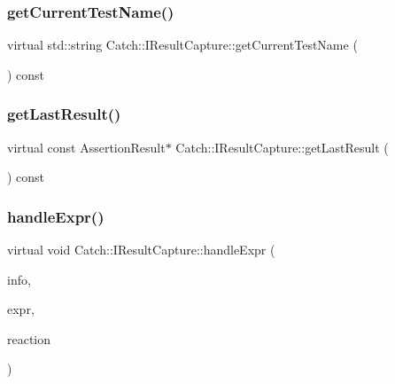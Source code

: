 \subsubsection{getCurrentTestName()}
{\footnotesize\ttfamily virtual std\+::string Catch\+::\+I\+Result\+Capture\+::get\+Current\+Test\+Name (\begin{DoxyParamCaption}{ }\end{DoxyParamCaption}) const\hspace{0.3cm}{\ttfamily [pure virtual]}}

\mbox{\label{struct_catch_1_1_i_result_capture_ab18872c89fab97405a56e9c6a4919736}} 
\subsubsection{getLastResult()}
{\footnotesize\ttfamily virtual const Assertion\+Result$\ast$ Catch\+::\+I\+Result\+Capture\+::get\+Last\+Result (\begin{DoxyParamCaption}{ }\end{DoxyParamCaption}) const\hspace{0.3cm}{\ttfamily [pure virtual]}}

\mbox{\label{struct_catch_1_1_i_result_capture_a59a2b05391e464954575d2afb6d5d607}} 
\subsubsection{handleExpr()}
{\footnotesize\ttfamily virtual void Catch\+::\+I\+Result\+Capture\+::handle\+Expr (\begin{DoxyParamCaption}\item[{\textbf{ Assertion\+Info} const \&}]{info,  }\item[{\textbf{ I\+Transient\+Expression} const \&}]{expr,  }\item[{\textbf{ Assertion\+Reaction} \&}]{reaction }\end{DoxyParamCaption})\hspace{0.3cm}{\ttfamily [pure virtual]}}

\mbox{\label{struct_catch_1_1_i_result_capture_a48559e6598ba9474b903697b69c769b2}} 
